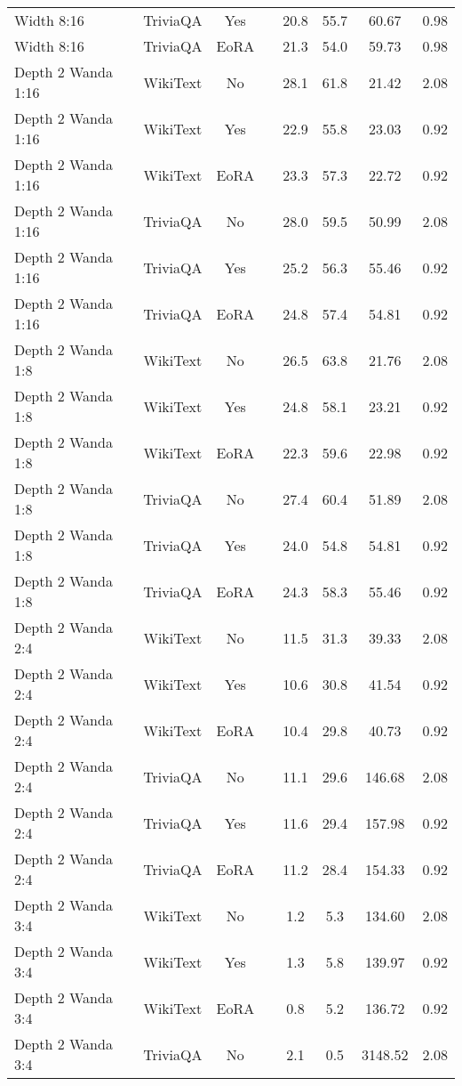 \begin{longtable}{lcclcccc}
Width 8:16 & TriviaQA & Yes & & 20.8 & 55.7 & 60.67 & 0.98 \\
Width 8:16 & TriviaQA & EoRA & & 21.3 & 54.0 & 59.73 & 0.98 \\
Depth 2 Wanda 1:16 & WikiText & No & & 28.1 & 61.8 & 21.42 & 2.08 \\
Depth 2 Wanda 1:16 & WikiText & Yes & & 22.9 & 55.8 & 23.03 & 0.92 \\
Depth 2 Wanda 1:16 & WikiText & EoRA & & 23.3 & 57.3 & 22.72 & 0.92 \\
Depth 2 Wanda 1:16 & TriviaQA & No & & 28.0 & 59.5 & 50.99 & 2.08 \\
Depth 2 Wanda 1:16 & TriviaQA & Yes & & 25.2 & 56.3 & 55.46 & 0.92 \\
Depth 2 Wanda 1:16 & TriviaQA & EoRA & & 24.8 & 57.4 & 54.81 & 0.92 \\
Depth 2 Wanda 1:8 & WikiText & No & & 26.5 & 63.8 & 21.76 & 2.08 \\
Depth 2 Wanda 1:8 & WikiText & Yes & & 24.8 & 58.1 & 23.21 & 0.92 \\
Depth 2 Wanda 1:8 & WikiText & EoRA & & 22.3 & 59.6 & 22.98 & 0.92 \\
Depth 2 Wanda 1:8 & TriviaQA & No & & 27.4 & 60.4 & 51.89 & 2.08 \\
Depth 2 Wanda 1:8 & TriviaQA & Yes & & 24.0 & 54.8 & 54.81 & 0.92 \\
Depth 2 Wanda 1:8 & TriviaQA & EoRA & & 24.3 & 58.3 & 55.46 & 0.92 \\
Depth 2 Wanda 2:4 & WikiText & No & & 11.5 & 31.3 & 39.33 & 2.08 \\
Depth 2 Wanda 2:4 & WikiText & Yes & & 10.6 & 30.8 & 41.54 & 0.92 \\
Depth 2 Wanda 2:4 & WikiText & EoRA & & 10.4 & 29.8 & 40.73 & 0.92 \\
Depth 2 Wanda 2:4 & TriviaQA & No & & 11.1 & 29.6 & 146.68 & 2.08 \\
Depth 2 Wanda 2:4 & TriviaQA & Yes & & 11.6 & 29.4 & 157.98 & 0.92 \\
Depth 2 Wanda 2:4 & TriviaQA & EoRA & & 11.2 & 28.4 & 154.33 & 0.92 \\
Depth 2 Wanda 3:4 & WikiText & No & & 1.2 & 5.3 & 134.60 & 2.08 \\
Depth 2 Wanda 3:4 & WikiText & Yes & & 1.3 & 5.8 & 139.97 & 0.92 \\
Depth 2 Wanda 3:4 & WikiText & EoRA & & 0.8 & 5.2 & 136.72 & 0.92 \\
Depth 2 Wanda 3:4 & TriviaQA & No & & 2.1 & 0.5 & 3148.52 & 2.08 \\

\end{longtable}
